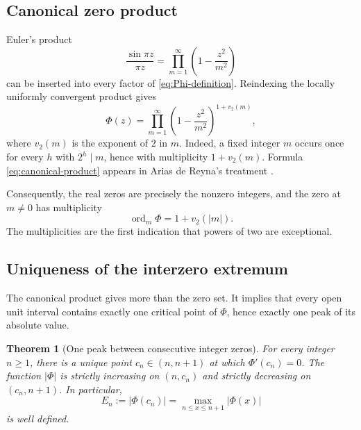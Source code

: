 \documentclass[11pt,oneside]{article}
\newtheorem{theorem}{Theorem}[section]
\theoremstyle{definition}
\theoremstyle{remark}
\newcommand{\vtwo}{v_2}
\newcommand{\PhiF}{\Phi}
\begin{document}
\subsection{Canonical zero product}

Euler's product
\[
 \frac{\sin\pi z}{\pi z}
 =\prod_{m=1}^{\infty}\left(1-\frac{z^2}{m^2}\right)
\]
can be inserted into every factor of \eqref{eq:Phi-definition}.  Reindexing
the locally uniformly convergent product gives
\begin{equation}
 \PhiF(z)=
 \prod_{m=1}^{\infty}
 \left(1-\frac{z^2}{m^2}\right)^{1+\vtwo(m)},
 \label{eq:canonical-product}
\end{equation}
where \(\vtwo(m)\) is the exponent of \(2\) in \(m\).  Indeed, a fixed
integer \(m\) occurs once for every \(h\) with \(2^h\mid m\), hence with
multiplicity \(1+\vtwo(m)\).  Formula \eqref{eq:canonical-product} appears in
Arias de Reyna's treatment \cite{arias2017}.

Consequently, the real zeros are precisely the nonzero integers, and the zero
at \(m\ne0\) has multiplicity
\begin{equation}
 \operatorname{ord}_{m}\PhiF=1+\vtwo(|m|).
 \label{eq:zero-multiplicity}
\end{equation}
The multiplicities are the first indication that powers of two are exceptional.

\subsection{Uniqueness of the interzero extremum}

The canonical product gives more than the zero set.  It implies that every
open unit interval contains exactly one critical point of \(\PhiF\), hence
exactly one peak of its absolute value.

\begin{theorem}[One peak between consecutive integer zeros]
\label{thm:unique-peak}
For every integer \(n\ge1\), there is a unique point
\(c_n\in(n,n+1)\) at which \(\PhiF'(c_n)=0\).  The function
\(|\PhiF|\) is strictly increasing on \((n,c_n)\) and strictly decreasing on
\((c_n,n+1)\).  In particular,
\[
 E_n:=|\PhiF(c_n)|
 =\max_{n\le x\le n+1}|\PhiF(x)|
\]
is well defined.
\end{theorem}
\end{document}
